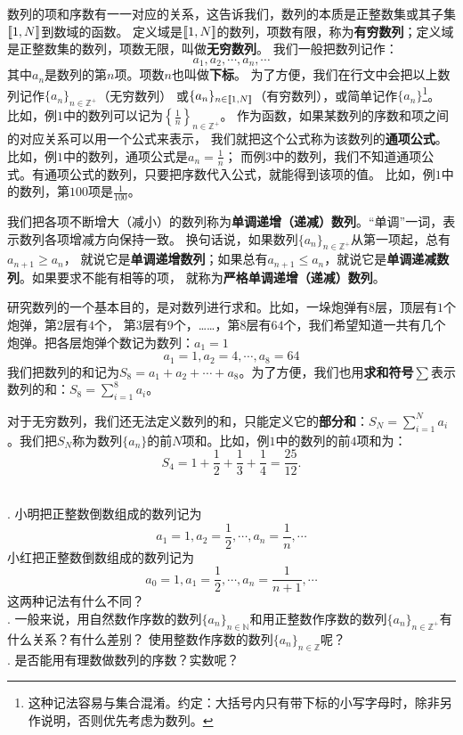 \documentclass[12pt,UTF8]{ctexbook}
\begin{document}
数列的项和序数有一一对应的关系，这告诉我们，数列的本质是正整数集或其子集$[\![1,N]\!]$到数域的函数。
定义域是$[\![1,N]\!]$的数列，项数有限，称为\textbf{有穷数列}；定义域是正整数集的数列，项数无限，叫做\textbf{无穷数列}。
我们一般把数列记作：
$$ a_1, a_2, \cdots, a_n, \cdots $$
其中$a_n$是数列的第$n$项。项数$n$也叫做\textbf{下标}。
为了方便，我们在行文中会把以上数列记作$\{a_n\}_{n\in\mathbb{Z}^+}$（无穷数列）
或$\{a_n\}_{n\in[\![1,N]\!]}$（有穷数列），或简单记作$\{a_n\}$\footnote{这种记法容易与集合混淆。约定：大括号内只有带下标的小写字母时，除非另作说明，否则优先考虑为数列。}。
比如，例$1$中的数列可以记为$\left\{\frac{1}{n}\right\}_{n\in\mathbb{Z}^+}$。
作为函数，如果某数列的序数和项之间的对应关系可以用一个公式来表示，
我们就把这个公式称为该数列的\textbf{通项公式}。比如，例$1$中的数列，通项公式是$a_n = \frac{1}{n}$；
而例$3$中的数列，我们不知道通项公式。有通项公式的数列，只要把序数代入公式，就能得到该项的值。
比如，例$1$中的数列，第$100$项是$\frac{1}{100}$。

我们把各项不断增大（减小）的数列称为\textbf{单调递增（递减）数列}。“单调”一词，表示数列各项增减方向保持一致。
换句话说，如果数列$\{a_n\}_{n\in\mathbb{Z}^+}$从第一项起，总有$a_{n+1} \geqslant a_n$，
就说它是\textbf{单调递增数列}；如果总有$a_{n+1} \leqslant a_n$，就说它是\textbf{单调递减数列}。如果要求不能有相等的项，
就称为\textbf{严格单调递增（递减）数列}。

研究数列的一个基本目的，是对数列进行求和。比如，一垛炮弹有$8$层，顶层有$1$个炮弹，第$2$层有$4$个，
第$3$层有$9$个，……，第$8$层有$64$个，我们希望知道一共有几个炮弹。把各层炮弹个数记为数列：$a_1 = 1$
$$ a_1 = 1, a_2 = 4, \cdots, a_8 = 64 $$
我们把数列的和记为$S_8 = a_1 + a_2 + \cdots + a_8$。为了方便，我们也用\textbf{求和符号}$\sum$表示数列的和：$S_8 = \sum_{i=1}^8 a_i$。

对于无穷数列，我们还无法定义数列的和，只能定义它的\textbf{部分和}：$S_N = \sum_{i=1}^N a_i$。我们把$S_N$称为数列$\{a_n\}$的前$N$项和。比如，例$1$中的数列的前$4$项和为：
$$ S_4 = 1 + \frac{1}{2} + \frac{1}{3} + \frac{1}{4} =  \frac{25}{12}. $$

\begin{sk}
    \mbox{}\\
    . 小明把正整数倒数组成的数列记为
    $$a_1 = 1, a_2 = \frac12, \cdots, a_n = \frac1n, \cdots$$
    \indent 小红把正整数倒数组成的数列记为
    $$a_0 = 1, a_1 = \frac12, \cdots, a_n = \frac{1}{n+1}, \cdots$$
    \indent 这两种记法有什么不同？\\
    . 一般来说，用自然数作序数的数列$\{a_n\}_{n\in\mathbb{N}}$和用正整数作序数的数列$\{a_n\}_{n\in\mathbb{Z}^+}$有什么关系？有什么差别？
    使用整数作序数的数列$\{a_n\}_{n\in\mathbb{Z}}$呢？\\
    . 是否能用有理数做数列的序数？实数呢？    
\end{sk}
\end{document}
